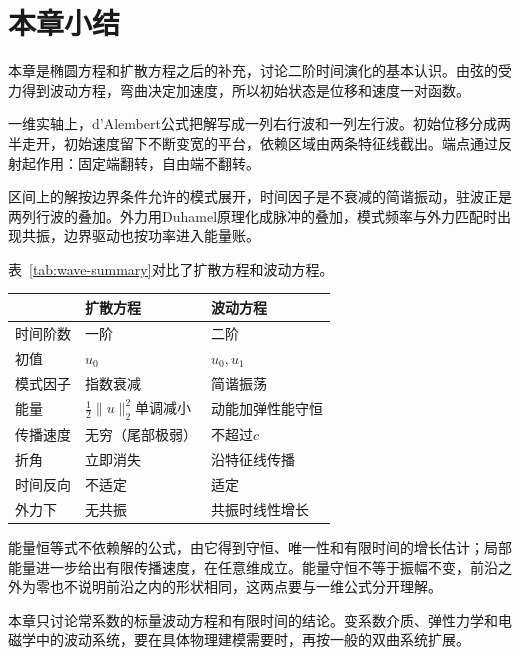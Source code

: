 \section{本章小结}
\label{sec:wave-summary}

本章是椭圆方程和扩散方程之后的补充，讨论二阶时间演化的基本认识。由弦的受力得到波动方程，弯曲决定加速度，所以初始状态是位移和速度一对函数。

一维实轴上，d'Alembert公式把解写成一列右行波和一列左行波。初始位移分成两半走开，初始速度留下不断变宽的平台，依赖区域由两条特征线截出。端点通过反射起作用：固定端翻转，自由端不翻转。

区间上的解按边界条件允许的模式展开，时间因子是不衰减的简谐振动，驻波正是两列行波的叠加。外力用Duhamel原理化成脉冲的叠加，模式频率与外力匹配时出现共振，边界驱动也按功率进入能量账。

表~\ref{tab:wave-summary}对比了扩散方程和波动方程。

\begin{BookInlineTable}
  \centering
  \caption{扩散方程与波动方程的对比}
  \label{tab:wave-summary}
  \begin{tabular}{lll}
    \toprule
    & 扩散方程 & 波动方程\\
    \midrule
    时间阶数 & 一阶 & 二阶\\
    初值 & $u_0$ & $u_0,u_1$\\
    模式因子 & 指数衰减 & 简谐振荡\\
    能量 & $\frac12\lVert u\rVert_2^{2}$单调减小 & 动能加弹性能守恒\\
    传播速度 & 无穷（尾部极弱） & 不超过$c$\\
    折角 & 立即消失 & 沿特征线传播\\
    时间反向 & 不适定 & 适定\\
    外力下 & 无共振 & 共振时线性增长\\
    \bottomrule
  \end{tabular}
\end{BookInlineTable}

能量恒等式不依赖解的公式，由它得到守恒、唯一性和有限时间的增长估计；局部能量进一步给出有限传播速度，在任意维成立。能量守恒不等于振幅不变，前沿之外为零也不说明前沿之内的形状相同，这两点要与一维公式分开理解。

本章只讨论常系数的标量波动方程和有限时间的结论。变系数介质、弹性力学和电磁学中的波动系统，要在具体物理建模需要时，再按一般的双曲系统扩展。
